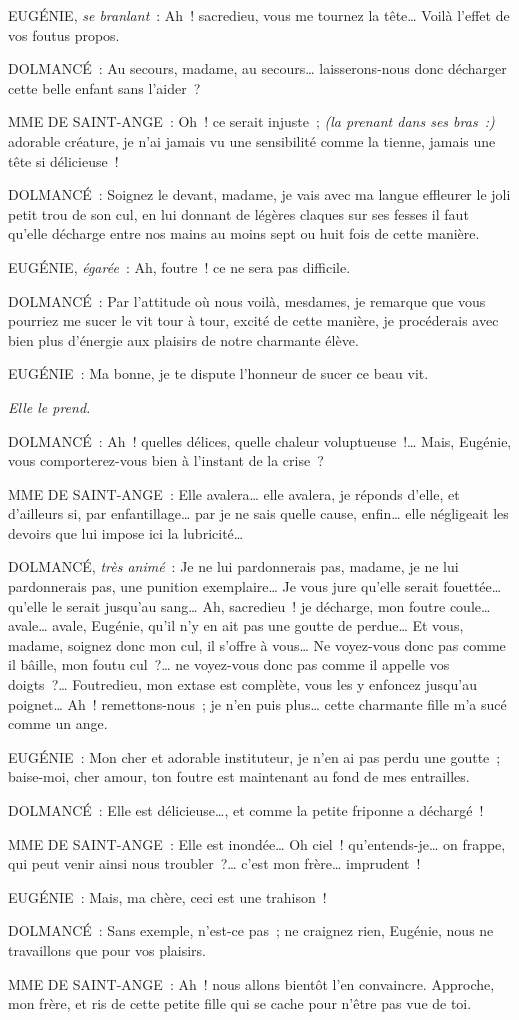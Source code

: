 \documentclass[french,twoside]{book} %
\begin{document}
EUGÉNIE, {\itshape se branlant} : Ah ! sacredieu, vous me tournez la tête… Voilà l’effet de vos foutus propos.\par
DOLMANCÉ : Au secours, madame, au secours… laisserons-nous donc décharger cette belle enfant sans l’aider ?\par
MME DE SAINT-ANGE : Oh ! ce serait injuste ; {\itshape (la prenant dans ses bras :)} adorable créature, je n’ai jamais vu une sensibilité comme la tienne, jamais une tête si délicieuse !\par
DOLMANCÉ : Soignez le devant, madame, je vais avec ma langue effleurer le joli petit trou de son cul, en lui donnant de légères claques sur ses fesses il faut qu’elle décharge entre nos mains au moins sept ou huit fois de cette manière.\par
EUGÉNIE, {\itshape égarée} : Ah, foutre ! ce ne sera pas difficile.\par
DOLMANCÉ : Par l’attitude où nous voilà, mesdames, je remarque que vous pourriez me sucer le vit tour à tour, excité de cette manière, je procéderais avec bien plus d’énergie aux plaisirs de notre charmante élève.\par
EUGÉNIE : Ma bonne, je te dispute l’honneur de sucer ce beau vit.\par
{\itshape Elle le prend.}\par
DOLMANCÉ : Ah ! quelles délices, quelle chaleur voluptueuse !… Mais, Eugénie, vous comporterez-vous bien à l’instant de la crise ?\par
MME DE SAINT-ANGE : Elle avalera… elle avalera, je réponds d’elle, et d’ailleurs si, par enfantillage… par je ne sais quelle cause, enfin… elle négligeait les devoirs que lui impose ici la lubricité…\par
DOLMANCÉ, {\itshape très animé} : Je ne lui pardonnerais pas, madame, je ne lui pardonnerais pas, une punition exemplaire… Je vous jure qu’elle serait fouettée… qu’elle le serait jusqu’au sang… Ah, sacredieu ! je décharge, mon foutre coule… avale… avale, Eugénie, qu’il n’y en ait pas une goutte de perdue… Et vous, madame, soignez donc mon cul, il s’offre à vous… Ne voyez-vous donc pas comme il bâille, mon foutu cul ?… ne voyez-vous donc pas comme il appelle vos doigts ?… Foutredieu, mon extase est complète, vous les y enfoncez jusqu’au poignet… Ah ! remettons-nous ; je n’en puis plus… cette charmante fille m’a sucé comme un ange.\par
EUGÉNIE : Mon cher et adorable instituteur, je n’en ai pas perdu une goutte ; baise-moi, cher amour, ton foutre est maintenant au fond de mes entrailles.\par
DOLMANCÉ : Elle est délicieuse…, et comme la petite friponne a déchargé !\par
MME DE SAINT-ANGE : Elle est inondée… Oh ciel ! qu’entends-je… on frappe, qui peut venir ainsi nous troubler ?… c’est mon frère… imprudent !\par
EUGÉNIE : Mais, ma chère, ceci est une trahison !\par
DOLMANCÉ : Sans exemple, n’est-ce pas ; ne craignez rien, Eugénie, nous ne travaillons que pour vos plaisirs.\par
MME DE SAINT-ANGE : Ah ! nous allons bientôt l’en convaincre. Approche, mon frère, et ris de cette petite fille qui se cache pour n’être pas vue de toi.
\end{document}
